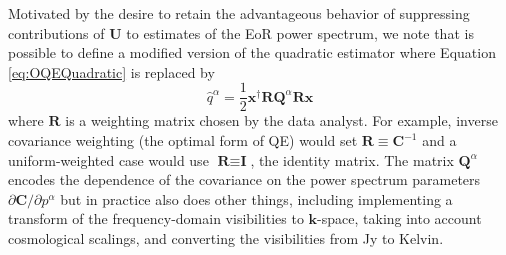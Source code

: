 \documentclass[preprint2,numberedappendix,tighten]{aastex6}  %
\newcommand{\C}{\mathbf{C}}
\begin{document}
Motivated by the desire to retain the advantageous behavior of suppressing contributions of $\mathbf{U}$ to estimates of the EoR power spectrum, we note that is possible to define a modified version of the quadratic estimator 
where Equation \eqref{eq:OQEQuadratic} is replaced by
\begin{equation}
\label{eq:qhat}
\widehat{q}^{\alpha} = \frac{1}{2}\textbf{x}^{\dagger}\textbf{R}\textbf{Q}^{\alpha}\textbf{R}\textbf{x}
\end{equation}
where $\textbf{R}$ is a weighting matrix chosen by the data analyst.  For example, inverse covariance weighting (the optimal form of QE) would set $\textbf{R} \equiv \textbf{C}^{-1}$ and a uniform-weighted case would use $\textbf{R} \equiv \textbf{I}$, the identity matrix.
The matrix $\textbf{Q}^{\alpha}$ encodes the dependence of the covariance on the power spectrum parameters $\partial \C/\partial p^\alpha$ but in practice also does other things, including implementing a transform of the frequency-domain visibilities to $\mathbf{k}$-space, taking into account cosmological scalings, and converting the visibilities from Jy to Kelvin.
\end{document}
